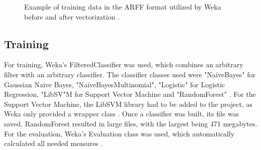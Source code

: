 \begin{figure}
    \centering
{}
\vspace{5mm}
    \caption{Example of training data in the ARFF format utilized by Weka before and after vectorization \cite{weka}.}
    \label{fig:arff_train}
\end{figure}

\subsection{Training}
For training, Weka's FilteredClassifier was used, which combines an arbitrary filter with an arbitrary classifier. The classifier classes used were "NaiveBayes" for Gaussian Naive Bayes, "NaiveBayesMultinomial", "Logistic" for Logistic Regression, "LibSV"M for Support Vector Machine and "RandomForest" \cite{weka}. For the Support Vector Machine, the LibSVM library had to be added to the project, as Weka only provided a wrapper class \cite{Chang2001}. Once a classifier was built, its file was saved. RandomForest resulted in large files, with the largest being 471 megabytes. For the evaluation, Weka's Evaluation class was used, which automatically calculated all needed measures \cite{weka}.